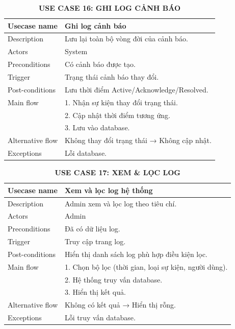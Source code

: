 \begin{table}[H]
\centering
\caption*{\textbf{USE CASE 16: GHI LOG CẢNH BÁO}}
\renewcommand{\arraystretch}{1.3}
\begin{tabular}{|p{4cm}|p{11cm}|}
\hline
Usecase name & Ghi log cảnh báo \\
\hline
Description & Lưu lại toàn bộ vòng đời của cảnh báo. \\
\hline
Actors & System \\
\hline
Preconditions & Có cảnh báo được tạo. \\
\hline
Trigger & Trạng thái cảnh báo thay đổi. \\
\hline
Post-conditions & Lưu thời điểm Active/Acknowledge/Resolved. \\
\hline
Main flow &
1. Nhận sự kiện thay đổi trạng thái.\\ &
2. Cập nhật thời điểm tương ứng.\\ &
3. Lưu vào database. \\
\hline
Alternative flow & Không thay đổi trạng thái → Không cập nhật. \\
\hline
Exceptions & Lỗi database. \\
\hline
\end{tabular}
\end{table}
\begin{table}[H]
\centering
\caption*{\textbf{USE CASE 17: XEM \& LỌC LOG}}
\renewcommand{\arraystretch}{1.3}
\begin{tabular}{|p{4cm}|p{11cm}|}
\hline
Usecase name & Xem và lọc log hệ thống \\
\hline
Description & Admin xem và lọc log theo tiêu chí. \\
\hline
Actors & Admin \\
\hline
Preconditions & Đã có dữ liệu log. \\
\hline
Trigger & Truy cập trang log. \\
\hline
Post-conditions & Hiển thị danh sách log phù hợp điều kiện lọc. \\
\hline
Main flow &
1. Chọn bộ lọc (thời gian, loại sự kiện, người dùng).\\ &
2. Hệ thống truy vấn database.\\ &
3. Hiển thị kết quả. \\
\hline
Alternative flow & Không có kết quả → Hiển thị rỗng. \\
\hline
Exceptions & Lỗi truy vấn database. \\
\hline
\end{tabular}
\end{table}
